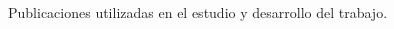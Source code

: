 \begin{thebibliography}{99}

 Publicaciones utilizadas en el estudio y desarrollo del trabajo.
\end{thebibliography}
